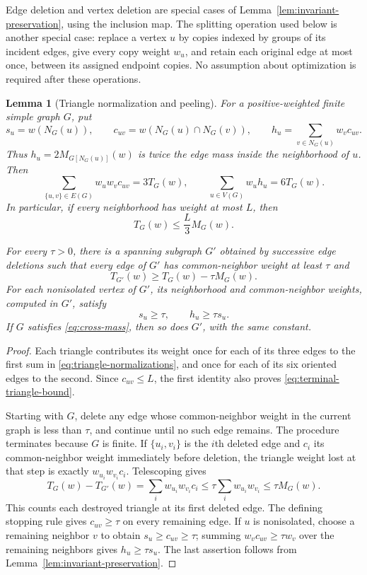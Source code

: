 \documentclass[11pt]{article}
\newtheorem{lemma}[theorem]{Lemma}
\theoremstyle{definition}
\theoremstyle{remark}
\numberwithin{equation}{section}
\begin{document}
Edge deletion and vertex deletion are special cases of
Lemma~\ref{lem:invariant-preservation}, using the inclusion map.
The splitting operation used below is another special case: replace a
vertex $u$ by copies indexed by groups of its incident edges, give every
copy weight $w_u$, and retain each original edge at most once, between
its assigned endpoint copies.  No assumption about optimization is
required after these operations.

\begin{lemma}[Triangle normalization and peeling]
\label{lem:triangle-peeling}
For a positive-weighted finite simple graph $G$, put
\[
 s_u=w(N_G(u)),\qquad
 c_{uv}=w(N_G(u)\cap N_G(v)),\qquad
 h_u=\sum_{v\in N_G(u)}w_vc_{uv}.
\]
Thus $h_u=2M_{G[N_G(u)]}(w)$ is twice the edge mass inside the
neighborhood of $u$.
Then
\begin{equation}
 \label{eq:triangle-normalizations}
 \sum_{\{u,v\}\in E(G)}w_uw_vc_{uv}=3T_G(w),
 \qquad
 \sum_{u\in V(G)}w_uh_u=6T_G(w).
\end{equation}
In particular, if every neighborhood has weight at most $L$, then
\begin{equation}
 \label{eq:terminal-triangle-bound}
 T_G(w)\le \frac{L}{3}M_G(w).
\end{equation}

For every $\tau>0$, there is a spanning subgraph $G'$ obtained by
successive edge deletions such that every edge of $G'$ has common-neighbor
weight at least $\tau$ and
\begin{equation}
 \label{eq:peeling-loss}
 T_{G'}(w)\ge T_G(w)-\tau M_G(w).
\end{equation}
For each nonisolated vertex of $G'$, its neighborhood and common-neighbor
weights, computed in $G'$, satisfy
\[
 s_u\ge\tau,\qquad h_u\ge\tau s_u.
\]
If $G$ satisfies \eqref{eq:cross-mass}, then so does $G'$,
with the same constant.
\end{lemma}

\begin{proof}
Each triangle contributes its weight once for each of its three edges
to the first sum in \eqref{eq:triangle-normalizations}, and once for
each of its six oriented edges to the second.  Since $c_{uv}\le L$,
the first identity also proves \eqref{eq:terminal-triangle-bound}.

Starting with $G$, delete any edge whose common-neighbor weight in the
current graph is less than $\tau$, and continue until no such edge
remains.  The procedure terminates because $G$ is finite.  If
$\{u_i,v_i\}$ is the $i$th deleted edge and $c_i$ its common-neighbor
weight immediately before deletion, the triangle weight lost at that
step is exactly $w_{u_i}w_{v_i}c_i$.  Telescoping gives
\[
 T_G(w)-T_{G'}(w)
 =\sum_iw_{u_i}w_{v_i}c_i
 \le\tau\sum_iw_{u_i}w_{v_i}
 \le\tau M_G(w).
\]
This counts each destroyed triangle at its first deleted edge.
The defining stopping rule gives $c_{uv}\ge\tau$ on every remaining
edge.  If $u$ is nonisolated, choose a remaining neighbor $v$ to obtain
$s_u\ge c_{uv}\ge\tau$; summing $w_vc_{uv}\ge\tau w_v$ over the
remaining neighbors gives $h_u\ge\tau s_u$.  The last assertion follows
from Lemma~\ref{lem:invariant-preservation}.
\end{proof}
\end{document}
